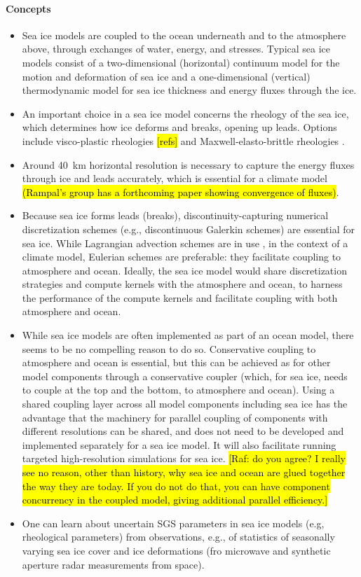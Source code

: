 \documentclass{article}
\begin{document}
\paragraph{Concepts}
\begin{itemize}
\item Sea ice models are coupled to the ocean underneath and to the atmosphere above, through exchanges of water, energy, and stresses. Typical sea ice models consist of a two-dimensional (horizontal) continuum model for the motion and deformation of sea ice and a one-dimensional (vertical) thermodynamic model \citep[e.g..][]{Semtner76a} for sea ice thickness and energy fluxes through the ice. 
\item An important choice in a sea ice model concerns the rheology of the sea ice, which determines how ice deforms and breaks, opening up leads. Options include visco-plastic rheologies \hl{[refs]} and Maxwell-elasto-brittle rheologies \citep{Dansereau16a,Weiss17a,Dansereau17a}.
\item Around 40~km horizontal resolution is necessary to capture the energy fluxes through ice and leads accurately, which is essential for a climate model \hl{(Rampal's group has a forthcoming paper showing convergence of fluxes)}.
\item Because sea ice forms leads (breaks), discontinuity-capturing numerical discretization schemes (e.g., discontinuous Galerkin schemes) are essential for sea ice. While Lagrangian advection schemes are in use \cite{Rampal16a}, in the context of a climate model, Eulerian schemes are preferable: they facilitate coupling to atmosphere and ocean. Ideally, the sea ice model would share discretization strategies and compute kernels with the atmosphere and ocean, to harness the performance of the compute kernels and facilitate coupling with both atmosphere and ocean.
\item While sea ice models are often implemented as part of an ocean model, there seems to be no compelling reason to do so. Conservative coupling to atmosphere and ocean is essential, but this can be achieved as for other model components through a conservative coupler (which, for sea ice, needs to couple at the top and the bottom, to atmosphere and ocean). Using a shared coupling layer across all model components including sea ice has the advantage that the machinery for parallel coupling of components with different resolutions can be shared, and does not need to be developed and implemented separately for a sea ice model. It will also facilitate running targeted high-resolution simulations for sea ice. \hl{[Raf: do you agree? I really see no reason, other than history, why sea ice and ocean are glued together the way they are today. If you do not do that, you can have component concurrency in the coupled model, giving additional parallel efficiency.]} 
\item One can learn about uncertain SGS parameters in sea ice models (e.g, rheological parameters) from observations, e.g., of statistics of seasonally varying sea ice cover and ice deformations (fro microwave and synthetic aperture radar measurements from space).
\end{itemize}
\end{document}
